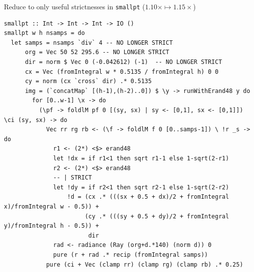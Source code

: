 \documentclass[8pt]{beamer}
\begin{document}
\begin{frame}[fragile]{ Reduce to only useful strictnesses in \texttt{smallpt} ($1.10\times \mapsto 1.15\times$)}
\begin{verbatim}
smallpt :: Int -> Int -> Int -> IO ()
smallpt w h nsamps = do
  let samps = nsamps `div` 4 -- NO LONGER STRICT
      org = Vec 50 52 295.6 -- NO LONGER STRICT
      dir = norm $ Vec 0 (-0.042612) (-1)  -- NO LONGER STRICT
      cx = Vec (fromIntegral w * 0.5135 / fromIntegral h) 0 0
      cy = norm (cx `cross` dir) .* 0.5135
      img = (`concatMap` [(h-1),(h-2)..0]) $ \y -> runWithErand48 y do
        for [0..w-1] \x -> do
          (\pf -> foldlM pf 0 [(sy, sx) | sy <- [0,1], sx <- [0,1]]) \ci (sy, sx) -> do
            Vec rr rg rb <- (\f -> foldlM f 0 [0..samps-1]) \ !r _s -> do
              r1 <- (2*) <$> erand48
              let !dx = if r1<1 then sqrt r1-1 else 1-sqrt(2-r1)
              r2 <- (2*) <$> erand48
              -- | STRICT
              let !dy = if r2<1 then sqrt r2-1 else 1-sqrt(2-r2)
                  !d = (cx .* (((sx + 0.5 + dx)/2 + fromIntegral x)/fromIntegral w - 0.5)) +
                       (cy .* (((sy + 0.5 + dy)/2 + fromIntegral y)/fromIntegral h - 0.5)) +
                        dir
              rad <- radiance (Ray (org+d.*140) (norm d)) 0
              pure (r + rad .* recip (fromIntegral samps))
            pure (ci + Vec (clamp rr) (clamp rg) (clamp rb) .* 0.25)
\end{verbatim}

\end{frame}

\end{document}
